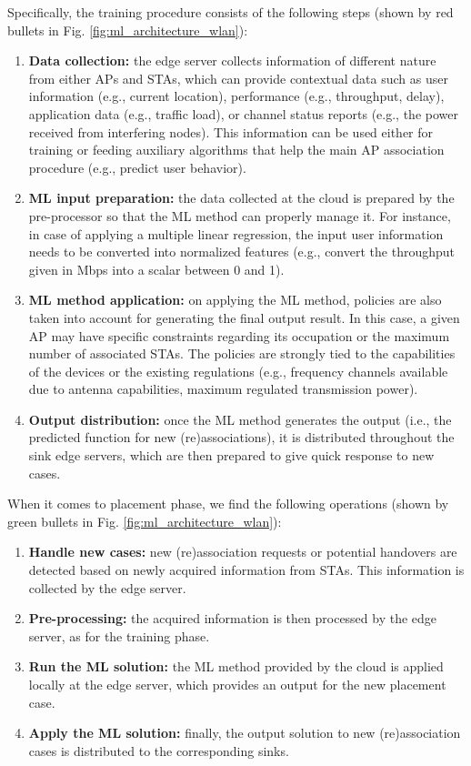 \documentclass[journal]{IEEEtran}
\begin{document}
Specifically, the training procedure consists of the following steps (shown by red bullets in Fig. \ref{fig:ml_architecture_wlan}):
\begin{enumerate}
	\item \textbf{Data collection:} the edge server collects information of different nature from either APs and STAs, which can provide contextual data such as user information (e.g., current location), performance (e.g., throughput, delay), application data (e.g., traffic load), or channel status reports (e.g., the power received from interfering nodes). This information can be used either for training or feeding auxiliary algorithms that help the main AP association procedure (e.g., predict user behavior).
	\item \textbf{ML input preparation:} the data collected at the cloud is prepared by the pre-processor so that the ML method can properly manage it. For instance, in case of applying a multiple linear regression, the input user information needs to be converted into normalized features (e.g., convert the throughput given in Mbps into a scalar between 0 and 1).
	\item \textbf{ML method application:} on applying the ML method, policies are also taken into account for generating the final output result. In this case, a given AP may have specific constraints regarding its occupation or the maximum number of associated STAs. The policies are strongly tied to the capabilities of the devices or the existing regulations (e.g., frequency channels available due to antenna capabilities, maximum regulated transmission power).
	\item \textbf{Output distribution:} once the ML method generates the output (i.e., the predicted function for new (re)associations), it is distributed throughout the sink edge servers, which are then prepared to give quick response to new cases.
\end{enumerate}

When it comes to placement phase, we find the following operations (shown by green bullets in Fig. \ref{fig:ml_architecture_wlan}):
\begin{enumerate}
	\item \textbf{Handle new cases:} new (re)association requests or potential handovers are detected based on newly acquired information from STAs. This information is collected by the edge server.
	\item \textbf{Pre-processing:} the acquired information is then processed by the edge server, as for the training phase.
	\item \textbf{Run the ML solution:} the ML method provided by the cloud is applied locally at the edge server, which provides an output for the new placement case.
	\item \textbf{Apply the ML solution:} finally, the output solution to new (re)association cases is distributed to the corresponding sinks.
\end{enumerate}
\end{document}
